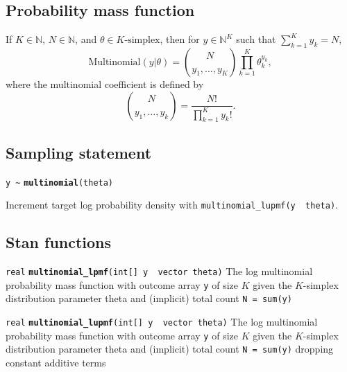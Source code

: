 \documentclass[
  10pt,
]{book}
\begin{document}
\hypertarget{probability-mass-function-16}{%
\subsection{Probability mass function}\label{probability-mass-function-16}}

If \(K \in \mathbb{N}\), \(N \in \mathbb{N}\), and \(\theta \in \text{$K$-simplex}\), then for \(y \in \mathbb{N}^K\) such that
\(\sum_{k=1}^K y_k = N\), \[ \text{Multinomial}(y|\theta) =
\binom{N}{y_1,\ldots,y_K} \prod_{k=1}^K \theta_k^{y_k}, \] where the
multinomial coefficient is defined by \[ \binom{N}{y_1,\ldots,y_k} =
\frac{N!}{\prod_{k=1}^K y_k!}. \]

\hypertarget{sampling-statement-20}{%
\subsection{Sampling statement}\label{sampling-statement-20}}

\texttt{y\ \textasciitilde{}} \textbf{\texttt{multinomial}}\texttt{(theta)}

Increment target log probability density with \texttt{multinomial\_lupmf(y\ \textbar{}\ theta)}.

\hypertarget{stan-functions-19}{%
\subsection{Stan functions}\label{stan-functions-19}}


\texttt{real} \textbf{\texttt{multinomial\_lpmf}}\texttt{(int{[}{]}\ y\ \textbar{}\ vector\ theta)}\newline
The log multinomial probability mass function with outcome array \texttt{y}
of size \(K\) given the \(K\)-simplex distribution parameter theta and
(implicit) total count \texttt{N\ =\ sum(y)}


\texttt{real} \textbf{\texttt{multinomial\_lupmf}}\texttt{(int{[}{]}\ y\ \textbar{}\ vector\ theta)}\newline
The log multinomial probability mass function with outcome array \texttt{y}
of size \(K\) given the \(K\)-simplex distribution parameter theta and
(implicit) total count \texttt{N\ =\ sum(y)} dropping constant additive terms
\end{document}
